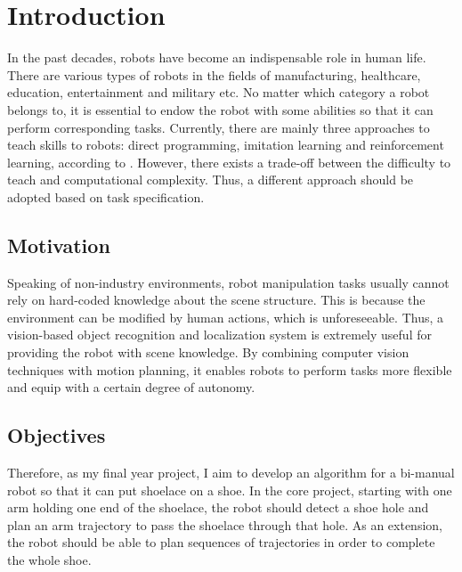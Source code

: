 \chapter{Introduction}

In the past decades, robots have become an indispensable role in human life. There are various types of robots in the fields of manufacturing, healthcare, education, entertainment and military etc. No matter which category a robot belongs to, it is essential to endow the robot with some abilities so that it can perform corresponding tasks. Currently, there are mainly three approaches to teach skills to robots: direct programming, imitation learning and reinforcement learning, according to \citep{Kormushev_MDPI_2013}. However, there exists a trade-off between the difficulty to teach and computational complexity. Thus, a different approach should be adopted based on task specification.

\section{Motivation}
Speaking of non-industry environments, robot manipulation tasks usually cannot rely on hard-coded knowledge about the scene structure. This is because the environment can be modified by human actions, which is unforeseeable. Thus, a vision-based object recognition and localization system is extremely useful for providing the robot with scene knowledge. By combining computer vision techniques with motion planning, it enables robots to perform tasks more flexible and equip with a certain degree of autonomy.

\section{Objectives}
Therefore, as my final year project, I aim to develop an algorithm for a bi-manual robot so that it can put shoelace on a shoe. In the core project, starting with one arm holding one end of the shoelace, the robot should detect a shoe hole and plan an arm trajectory to pass the shoelace through that hole. As an extension, the robot should be able to plan sequences of trajectories in order to complete the whole shoe.


